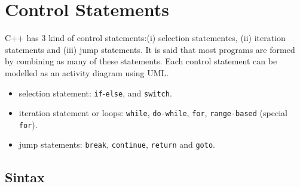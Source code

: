 \section{Control Statements}

C++ has 3 kind of control statements:(i) selection statementes, (ii) iteration statements and (iii) jump statements. It is said that most programs are formed by combining as many of these statements. Each control statement can be modelled as an activity diagram using \ac{UML}.

\begin{itemize}
    \item selection statement: \texttt{if}-\texttt{else}, and \texttt{switch}.
    \item iteration statement or loops: \texttt{while}, \texttt{do-while}, \texttt{for}, \texttt{range-based} (special \texttt{for}).
    \item jump statements: \texttt{break}, \texttt{continue}, \texttt{return} and \texttt{goto}.
\end{itemize}

\subsection{Sintax}